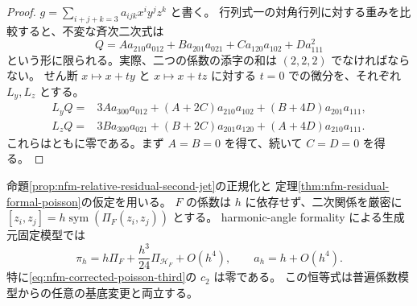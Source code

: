 \begin{proof}
$g=\sum_{i+j+k=3}a_{ijk}x^iy^jz^k$ と書く。
行列式一の対角行列に対する重みを比較すると、不変な斉次二次式は
\[
 Q=Aa_{210}a_{012}+Ba_{201}a_{021}
   +Ca_{120}a_{102}+Da_{111}^2
\]
という形に限られる。実際、二つの係数の添字の和は
$(2,2,2)$ でなければならない。
せん断 $x\mapsto x+ty$ と $x\mapsto x+tz$ に対する
$t=0$ での微分を、それぞれ $L_y,L_z$ とする。
\[
\begin{aligned}
 L_yQ={}&3Aa_{300}a_{012}
       +(A+2C)a_{210}a_{102}+(B+4D)a_{201}a_{111},\\
 L_zQ={}&3Ba_{300}a_{021}
       +(B+2C)a_{201}a_{120}+(A+4D)a_{210}a_{111}.
\end{aligned}
\]
これらはともに零である。まず $A=B=0$ を得て、続いて
$C=D=0$ を得る。
\end{proof}

\begin{proposition}[三次の補正スカラーの消滅]
\label{prop:nfm-third-tensor-scalar-zero}
命題\ref{prop:nfm-relative-residual-second-jet}の正規化と
定理\ref{thm:nfm-residual-formal-poisson}の仮定を用いる。
$F$ の係数は $h$ に依存せず、二次関係を厳密に
$[z_i,z_j]=h\operatorname{sym}(\Pi_F(z_i,z_j))$ とする。
harmonic-angle formality による生成元固定模型では
\begin{equation}
\label{eq:nfm-third-tensor-no-scalar}
 \pi_h=h\Pi_F+\frac{h^3}{24}\Pi_{\mathscr H_F}+O(h^4),
 \qquad a_h=h+O(h^4).
\end{equation}
特に\eqref{eq:nfm-corrected-poisson-third}の $c_2$ は零である。
この恒等式は普遍係数模型からの任意の基底変更と両立する。
\end{proposition}

